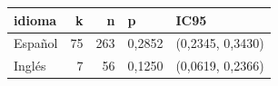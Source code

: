 \begingroup\small
\begin{tabular}{lrrll}
\toprule
idioma & k & n & p & IC95\\
\midrule
Español & 75 & 263 & 0,2852 & (0,2345, 0,3430)\\
Inglés & 7 & 56 & 0,1250 & (0,0619, 0,2366)\\
\bottomrule
\end{tabular}
\endgroup
